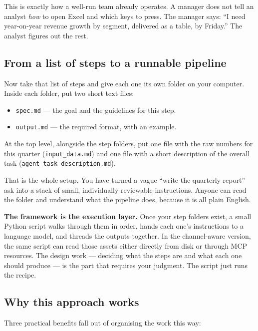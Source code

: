 \documentclass[12pt, a4paper]{article}
\begin{document}
This is exactly how a well-run team already operates. A manager does not tell an analyst \textit{how} to open Excel and which keys to press. The manager says: ``I need year-on-year revenue growth by segment, delivered as a table, by Friday.'' The analyst figures out the rest.

\subsection{From a list of steps to a runnable pipeline}

Now take that list of steps and give each one its own folder on your computer. Inside each folder, put two short text files:

\begin{itemize}[leftmargin=1.5em]
  \item \texttt{spec.md} --- the goal and the guidelines for this step.
  \item \texttt{output.md} --- the required format, with an example.
\end{itemize}

At the top level, alongside the step folders, put one file with the raw numbers for this quarter (\texttt{input\_data.md}) and one file with a short description of the overall task (\texttt{agent\_task\_description.md}).

That is the whole setup. You have turned a vague ``write the quarterly report'' ask into a stack of small, individually-reviewable instructions. Anyone can read the folder and understand what the pipeline does, because it is all plain English.

\begin{notebox}
\textbf{The framework is the execution layer.} Once your step folders exist, a small Python script walks through them in order, hands each one's instructions to a language model, and threads the outputs together. In the channel-aware version, the same script can read those assets either directly from disk or through MCP resources. The design work --- deciding what the steps are and what each one should produce --- is the part that requires your judgment. The script just runs the recipe.
\end{notebox}

\subsection{Why this approach works}

Three practical benefits fall out of organising the work this way:
\end{document}
